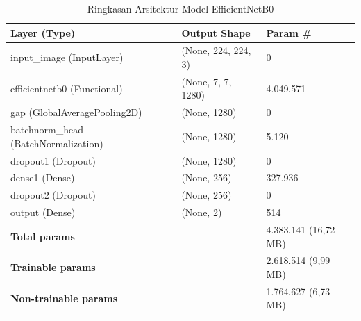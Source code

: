 \begin{table}[H]
	\centering
	\caption{Ringkasan Arsitektur Model EfficientNetB0}
	\label{tab:arsitektur_model}
	\begin{tabular}{|l|l|l|}
		\hline
		\textbf{Layer (Type)} & \textbf{Output Shape} & \textbf{Param \#} \\ \hline
		input\_image (InputLayer) & (None, 224, 224, 3) & 0 \\ \hline
		efficientnetb0 (Functional) & (None, 7, 7, 1280) & 4.049.571 \\ \hline
		gap (GlobalAveragePooling2D) & (None, 1280) & 0 \\ \hline
		batchnorm\_head (BatchNormalization) & (None, 1280) & 5.120 \\ \hline
		dropout1 (Dropout) & (None, 1280) & 0 \\ \hline
		dense1 (Dense) & (None, 256) & 327.936 \\ \hline
		dropout2 (Dropout) & (None, 256) & 0 \\ \hline
		output (Dense) & (None, 2) & 514 \\ \hline
		\multicolumn{2}{|l|}{\textbf{Total params}} & 4.383.141 (16,72 MB) \\ \hline
		\multicolumn{2}{|l|}{\textbf{Trainable params}} & 2.618.514 (9,99 MB) \\ \hline
		\multicolumn{2}{|l|}{\textbf{Non-trainable params}} & 1.764.627 (6,73 MB) \\ \hline
	\end{tabular}
\end{table}
